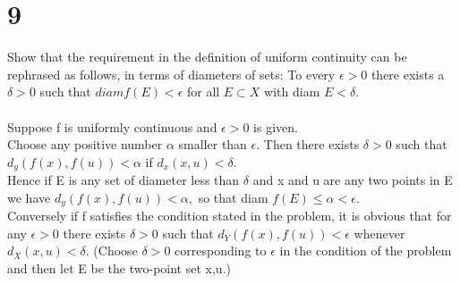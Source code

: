 \section*{9}
Show that the requirement in the definition of uniform continuity can be rephrased as follows, in terms of diameters of sets: To every $ \epsilon >0$ there exists a $\delta >0$ such that $diam f(E)< \epsilon$ for all $E \subset X$ with diam $E< \delta. $\\ 
 \\ 
Suppose f is uniformly continuous and $ \epsilon >0$ is given. \\ 
Choose any positive number $\alpha$ smaller than $\epsilon.$ Then there exists $\delta >0$ such that $d_y(f(x),f(u))<\alpha$ if $d_x(x,u)<\delta.$ \\ 
Hence if E is any set of diameter less than $\delta$ and x and u are any two points in E we have $d_y(f(x),f(u))< \alpha,$ so that diam $f(E) \leq \alpha < \epsilon.$ \\ 
Conversely if f satisfies the condition stated in the problem, it is obvious that for any $\epsilon >0$ there exists $\delta >0$ such that $d_Y(f(x),f(u))<\epsilon$ whenever $d_X(x,u)< \delta.$ (Choose $\delta>0$ corresponding to $\epsilon$ in the condition of the problem and then let E be the two-point set {x,u}.)\\ 
